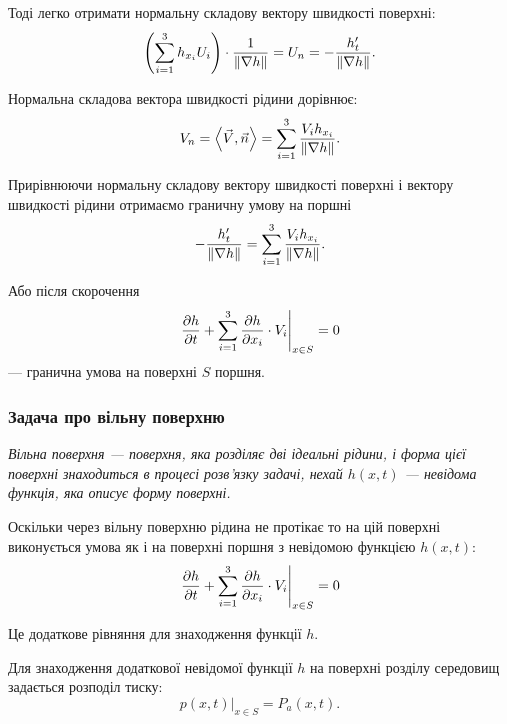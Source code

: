 Тоді легко отримати нормальну складову вектору швидкості поверхні:
\begin{equation}
	\left( \displaystyle\sum\limits_{i = 1}^3 h_{x_i} U_i \right) \cdot \frac{1}{\|\nabla h\|} = U_n = - \frac{h_t'}{\|\nabla h\|}.
\end{equation}

Нормальна складова вектора швидкості рідини дорівнює:
\begin{equation}
	V_n = \langle \vec V, \vec n\rangle = \Sum_{i = 1}^3 \frac{V_i h_{x_i}}{\|\nabla h\|}.
\end{equation}

Прирівнюючи нормальну складову вектору швидкості поверхні і вектору швидкості рідини отримаємо граничну умову на поршні 
\begin{equation}
	- \frac{h_t'}{\|\nabla h\|} = \displaystyle\sum\limits_{i = 1}^3 \frac{V_i h_{x_i}}{\|\nabla h\|}.
\end{equation}

Або після скорочення
\begin{equation}
	\left. \frac{\partial h}{\partial t} + \displaystyle\sum\limits_{i = 1}^3 \frac{\partial h}{\partial x_i} \cdot V_i \right|_{x \in S} = 0
\end{equation}
--- гранична умова на поверхні $S$ поршня.

\subsubsection{Задача про вільну поверхню}

\begin{definition}
	\it{Вільна поверхня} --- поверхня, яка розділяє дві ідеальні рідини, і форма цієї поверхні знаходиться в процесі розв'язку задачі, нехай $h(x, t)$ --- невідома функція, яка описує форму поверхні.
\end{definition}

Оскільки через вільну поверхню рідина не протікає то на цій поверхні виконується умова як і на поверхні поршня з невідомою функцією $h(x, t)$:
\begin{equation}
	\left. \frac{\partial h}{\partial t} + \displaystyle\sum\limits_{i = 1}^3 \frac{\partial h}{\partial x_i} \cdot V_i \right|_{x \in S} = 0
\end{equation}

Це додаткове рівняння для знаходження функції $h$. \medskip

Для знаходження додаткової невідомої функції $h$ на поверхні розділу середовищ задається розподіл тиску:
\begin{equation}
	\left. p(x, t) \right|_{x \in S} = P_a(x, t).
\end{equation}

